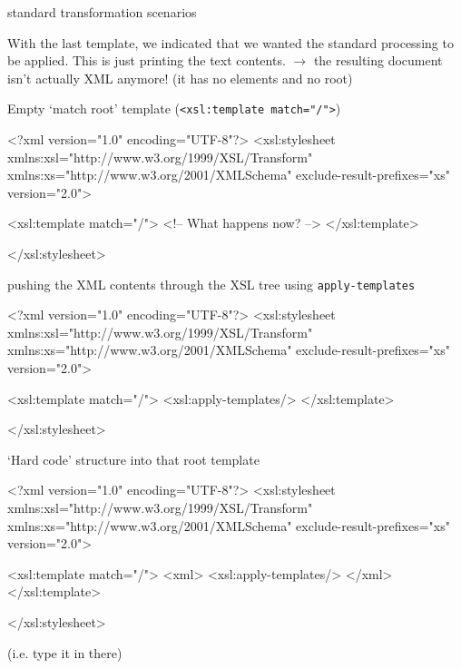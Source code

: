 
\begin{frame}{standard transformation scenarios}
\footnotesize{}

With the last template, we indicated that we wanted the standard processing to be applied. This is just printing the text contents. 
\alert{$\to$ the resulting document isn't actually XML anymore!} (it has no elements and no root)


\begin{block}{Empty `match root' template (\texttt{<xsl:template match="/">})}
\begin{xmlcode}
<?xml version="1.0" encoding="UTF-8"?>
<xsl:stylesheet xmlns:xsl="http://www.w3.org/1999/XSL/Transform"
    xmlns:xs="http://www.w3.org/2001/XMLSchema"
    exclude-result-prefixes="xs"
    version="2.0">
       
    <xsl:template match="/">
        <!-- What happens now? -->
    </xsl:template>
    
</xsl:stylesheet>
\end{xmlcode}
\end{block}

\framebreak 

\begin{block}{pushing the XML contents through the XSL tree using \texttt{apply-templates}}
\begin{xmlcode}
<?xml version="1.0" encoding="UTF-8"?>
<xsl:stylesheet xmlns:xsl="http://www.w3.org/1999/XSL/Transform"
    xmlns:xs="http://www.w3.org/2001/XMLSchema"
    exclude-result-prefixes="xs"
    version="2.0">
       
    <xsl:template match="/">
        <xsl:apply-templates/>
    </xsl:template>
    
</xsl:stylesheet>
\end{xmlcode}
\end{block}

\framebreak

\begin{block}{`Hard code' structure into that root template}
\begin{xmlcode}
<?xml version="1.0" encoding="UTF-8"?>
<xsl:stylesheet xmlns:xsl="http://www.w3.org/1999/XSL/Transform"
    xmlns:xs="http://www.w3.org/2001/XMLSchema"
    exclude-result-prefixes="xs"
    version="2.0">
       
    <xsl:template match="/">
        <xml>
            <xsl:apply-templates/> 
        </xml>
    </xsl:template>
    
</xsl:stylesheet>
\end{xmlcode}
 (i.e. type it in there)
\end{block}
\end{frame}

